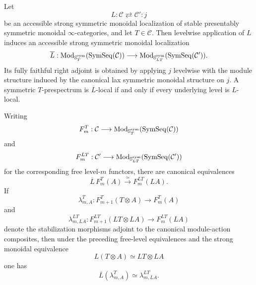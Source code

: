 \begin{lemma}
\label{lem:infinitesimal-levelwise-module-localization}
Let
\[
    L:\mathcal C\rightleftarrows\mathcal C':j
\]
be an accessible strong symmetric monoidal localization of stable presentably
symmetric monoidal $\infty$-categories, and let $T\in\mathcal C$.  Then
levelwise application of $L$ induces an accessible strong symmetric monoidal
localization
\[
    \overline L:
    \operatorname{Mod}_{\mathbb S_T^{\mathrm{sym}}}
    (\operatorname{SymSeq}(\mathcal C))
    \longrightarrow
    \operatorname{Mod}_{\mathbb S_{LT}^{\mathrm{sym}}}
    (\operatorname{SymSeq}(\mathcal C')).
\]
Its fully faithful right adjoint is obtained by applying $j$ levelwise with
the module structure induced by the canonical lax symmetric monoidal
structure on $j$.  A symmetric $T$-prespectrum is $\overline L$-local if and
only if every underlying level is $L$-local.

Writing
\[
    F_m^T:\mathcal C
    \longrightarrow
    \operatorname{Mod}_{\mathbb S_T^{\mathrm{sym}}}(\operatorname{SymSeq}(\mathcal C))
\]
and
\[
    F_m^{LT}:\mathcal C'
    \longrightarrow
    \operatorname{Mod}_{\mathbb S_{LT}^{\mathrm{sym}}}(\operatorname{SymSeq}(\mathcal C'))
\]
for the corresponding free level-$m$ functors, there are canonical
equivalences
\[
    \boxed{
    \overline L\,F_m^T(A)
    \xrightarrow{\simeq}
    F_m^{LT}(LA).
    }
\]
If
\[
    \lambda^T_{m,A}:
    F_{m+1}^T(T\otimes A)
    \longrightarrow
    F_m^T(A)
\]
and
\[
    \lambda^{LT}_{m,LA}:
    F_{m+1}^{LT}(LT\otimes LA)
    \longrightarrow
    F_m^{LT}(LA)
\]
denote the stabilization morphisms adjoint to the canonical module-action
composites, then under the preceding free-level equivalences and the strong
monoidal equivalence
\[
    L(T\otimes A)\simeq LT\otimes LA
\]
one has
\[
    \boxed{
    \overline L(\lambda^T_{m,A})
    \simeq
    \lambda^{LT}_{m,LA}.
    }
\]
\end{lemma}

